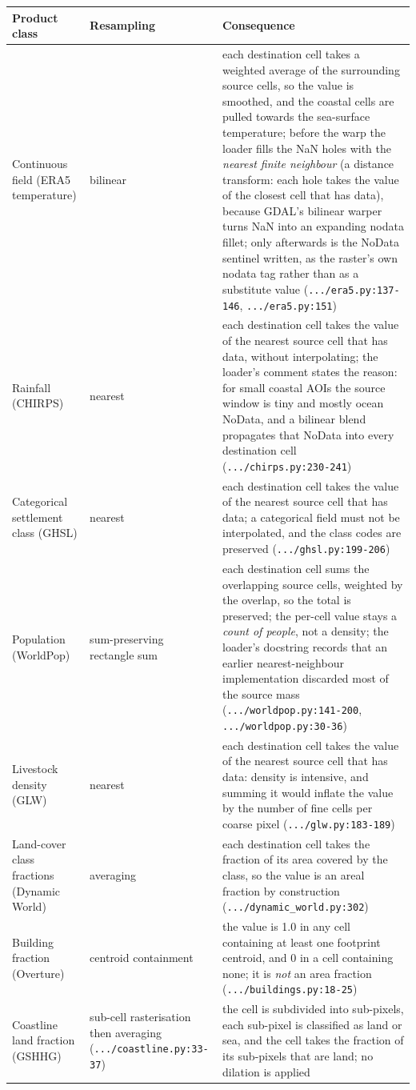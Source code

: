 \documentclass[11pt,a4paper]{article}
\newcommand{\code}[1]{\texttt{#1}}
\begin{document}
\small
\begin{longtable}{@{}p{3.3cm}p{3.4cm}p{}@{}}
\toprule
Product class & Resampling & Consequence \\
\midrule
\endhead
Continuous field (ERA5 temperature) & bilinear & each destination cell
takes a weighted average of
the surrounding source cells, so the value is smoothed, and the coastal
cells are pulled towards the sea-surface temperature; before the warp the
loader fills the NaN holes with the \emph{nearest finite neighbour} (a
distance transform: each hole takes the value of the closest cell that has
data), because GDAL's bilinear warper turns NaN into an expanding nodata
fillet; only afterwards is the NoData sentinel written, as the raster's own
nodata tag rather than as a substitute value
(\code{.../era5.py:137-146}, \code{.../era5.py:151}) \\
Rainfall (CHIRPS) & nearest & each
destination cell takes the value of the nearest source cell that has data,
without interpolating; the loader's comment states the reason: for small
coastal AOIs the source window is tiny and mostly ocean NoData, and a
bilinear blend propagates that NoData into every destination cell
(\code{.../chirps.py:230-241}) \\
Categorical settlement class (GHSL) & nearest & each destination cell takes
the value of the
nearest source cell that has data; a categorical field must not be
interpolated, and the class codes are preserved
(\code{.../ghsl.py:199-206}) \\
Population (WorldPop) & sum-preserving rectangle sum & each destination cell
sums the
overlapping source cells, weighted by the overlap, so the total is
preserved; the per-cell value stays a \emph{count of people}, not a density;
the loader's docstring records that an earlier nearest-neighbour
implementation discarded most of the source mass
(\code{.../worldpop.py:141-200}, \code{.../worldpop.py:30-36}) \\
Livestock density (GLW) & nearest & each
destination cell takes the value of the nearest source cell that has data:
density is intensive, and summing it would inflate the value by the number
of fine cells per coarse pixel (\code{.../glw.py:183-189}) \\
Land-cover class fractions (Dynamic World) & averaging & each destination
cell takes the
fraction of its area covered by the class, so the value is an areal
fraction by construction (\code{.../dynamic\_world.py:302}) \\
Building fraction (Overture) & centroid containment & the value is 1.0 in
any cell containing at
least one footprint centroid, and 0 in a cell containing none; it is
\emph{not} an area fraction (\code{.../buildings.py:18-25}) \\
Coastline land fraction (GSHHG) & sub-cell rasterisation then averaging
(\code{.../coastline.py:33-37}) & the cell is subdivided into sub-pixels,
each sub-pixel is classified as land or sea, and the cell takes the
fraction of its sub-pixels that are land; no dilation is applied \\
\bottomrule
\end{longtable}
\normalsize
\label{tab:resampling}
\end{document}
